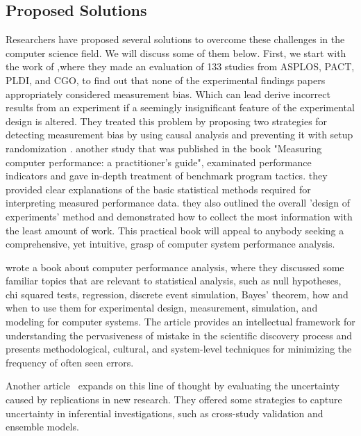 \subsection{Proposed Solutions}\label{sec:soa_reproducibility}
Researchers have proposed several solutions to overcome these challenges in the computer science field. We will discuss some of them below.
First, we start with the work of \citeauthor{mytkowicz2009producing} ,where they made an evaluation  of 133 studies from ASPLOS, PACT, PLDI, and CGO, to find out that none of the experimental findings papers appropriately considered measurement bias. Which can lead derive incorrect results from an experiment if a seemingly insignificant feature of the experimental design is altered. They treated this problem by proposing two strategies for detecting measurement bias by using causal analysis and preventing it with setup randomization \cite{mytkowicz2009producing}.
another study that was published in the book "Measuring computer performance: a practitioner's guide"\cite{lilja2005measuring},\citeauthor{lilja2005measuring} examinated performance indicators and gave in-depth treatment of benchmark program tactics. they provided clear explanations of the basic statistical methods required for interpreting measured performance data. they also outlined the overall 'design of experiments' method and demonstrated how to collect the most information with the least amount of work. This practical book will appeal to anybody seeking a comprehensive, yet intuitive, grasp of computer system performance analysis.

\citeauthor{bukh1992art} wrote a book about computer performance analysis, where they discussed some familiar topics that are relevant to statistical analysis, such as null hypotheses, chi squared tests, regression, discrete event simulation, Bayes' theorem, how and when to use them for experimental design, measurement, simulation, and modeling for computer systems.
The article \cite{brown2018issues} provides an intellectual framework for understanding the pervasiveness of mistake in the scientific discovery process and presents methodological, cultural, and system-level techniques for minimizing the frequency of often seen errors.

Another article~\cite{patil2018training} expands on this line of thought by evaluating the uncertainty caused by replications in new research. They offered some strategies to capture uncertainty in inferential investigations, such as cross-study validation and ensemble models.

